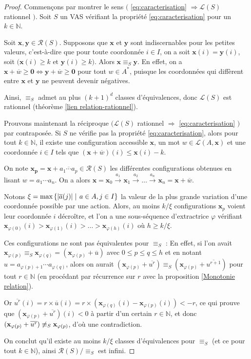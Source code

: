 \documentclass[a4paper,final]{article}
\theoremstyle{definition}
\let\phi\varphi
\let\leq\leqslant
\let\geq\geqslant
\newcommand{\set}[2]{\left\{#1\mathrel{\left|\vphantom{#1}\vphantom{#2}\right.}#2\right\}}
\newcommand{\abs}[1]{\ensuremath{\displaystyle\left\lvert #1 \right\rvert}}
\newcommand{\N}{\ensuremath{\mathbb{N}}}
\newcommand{\lang}{\ensuremath{\mathcal{L}}}
\newcommand{\reach}{\ensuremath{\mathcal{R}}}
\newcommand{\trans}[2]{\ensuremath{\stackrel{#1}{\longrightarrow}_{#2}}}
\newcommand{\vect}[1]{\ensuremath{\mathbf{#1}}}
\newcommand{\rel}{\ensuremath{\equiv}}
\newcommand{\equivaut}{\ensuremath{\Leftrightarrow}}
\newcommand{\valeur}[1]{\ensuremath{\overline{#1}}}
\begin{document}
\begin{proof}
Commençons par montrer le sens $\big($ \eqref{eq:caracterisation} $\Rightarrow \lang(S)$ rationnel $\big)$.
Soit $S$ un VAS vérifiant la propriété \eqref{eq:caracterisation} pour un $k\in\N$.

Soit $\vect{x},\vect{y}\in\reach(S)$.
Supposons que $\vect{x}$ et $\vect{y}$ sont indiscernables pour les petites valeurs, c'est-à-dire que pour toute coordonnée $i\in I$, on a 
soit $\vect{x}(i)=\vect{y}(i)$, 
soit $\big( \vect{x}(i)\geq k \text{ et } \vect{y}(i)\geq k \big)$.
Alors $\vect{x}\rel_S \vect{y}$. 
En effet, on a $\vect{x} +\valeur{w} \geq\vect{0} \equivaut \vect{y} +\valeur{w} \geq\vect{0}$ pour tout $w\in A^\ast$, 
puisque les coordonnées qui diffèrent entre $\vect{x}$ et $\vect{y}$ ne peuvent devenir négatives.

Ainsi, $\rel_S$ admet au plus $(k+1)^d$ classes d'équivalences, donc $\lang(S)$ est rationnel (théorème \ref{lien relation-rationnel}).

\vspace{4mm}\noindent
Prouvons maintenant la réciproque $\big(\lang(S)$ rationnel $\Rightarrow$ \eqref{eq:caracterisation} $\big)$ par contraposée.
Si $S$ ne vérifie pas la propriété \eqref{eq:caracterisation}, alors
pour tout $k\in\N$, il existe une configuration accessible $\vect{x}$, un mot $w\in \lang(A,\vect{x})$ et une coordonnée $i\in I$ tels que $(\vect{x} +\valeur{w})(i)\leq \vect{x}(i)-k$.

On note $\vect{x_p} = \vect{x} +\valeur{a_1\cdots a_p} \in\reach(S)$ les différentes configurations obtenues en lisant $w=a_1\cdots a_n$.
On a alors $\vect{x}=\vect{x}_0 \trans{a_1}{}\vect{x}_1 \trans{a_2}{}\dots \trans{a_n}{}\vect{x}_n= \vect{x} +\valeur{w}$.

Notons $\xi = \text{max}\set{\abs{\valeur{a}(j)}} {a\in A, j\in I}$ la valeur de la plus grande variation d'une coordonnée possible par une action.
Alors, au moins $k/\xi$ configurations $\vect{x}_p$ voient leur coordonnée $i$ décroître,
et l'on a une sous-séquence d'extractrice $\phi$ vérifiant $\vect{x}_{\phi(0)}(i)>\vect{x}_{\phi(1)}(i)>\dots>\vect{x}_{\phi(h)}(i)$ où $h\geq k/\xi$.


Ces configurations ne sont pas équivalentes pour $\rel_S$ :
En effet, si l'on avait $\vect{x}_{\phi(p)}\rel_S \vect{x}_{\phi(q)} = (\vect{x}_{\phi(p)} +\valeur{u})$ avec $0\leq p\leq q\leq h$ et en notant $u=a_{\phi(p)+1}\cdots a_{\phi(q)}$, 
alors on aurait $(\vect{x}_{\phi(p)} +\valeur{u^r}) \rel_S (\vect{x}_{\phi(p)} +\valeur{u^{r+1}})$ pour tout $r\in\N$ (en procédant par récurrence sur $r$ avec la proposition \ref{Monotonie relation}).

Or $\valeur{u^r}(i) = r\times\valeur{u}(i) = r\times (\vect{x}_{\phi(q)}(i) -\vect{x}_{\phi(p)}(i)) < -r$, 
ce qui prouve que $(\vect{x}_{\phi(p)} +\valeur{u^r})(i)<0$ à partir d'un certain $r\in\N$, 
et donc $(\vect{x}_{\phi(p)} +\valeur{u^r}) \not\rel_S \vect{x}_{\phi(p)}$, d'où une contradiction.

On conclut qu'il existe au moins $k/\xi$ classes d'équivalences pour $\rel_S$ (et ce pour tout $k\in\N$), 
ainsi $\reach(S)/\rel_S$ est infini.
\end{proof}
\end{document}
